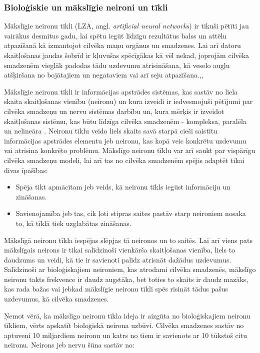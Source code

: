 \documentclass[12pt,paper=a4]{report}
\begin{document}
\subsubsection{Bioloģiskie un mākslīgie neironi un tīkli}
Mākslīgie neironu tīkli (LZA, angl. \textit{artificial neural networks}) ir tikuši pētīti jau vairākus desmitus gadu, lai spētu iegūt līdzīgu rezultātus balss un attēlu atpazīšanā kā izmantojot cilvēka maņu orgānus un smadzenes. Lai arī datoru skaitļošanas jaudas šobrīd ir kļuvušas spēcīgākas kā vēl nekad, joprojām cilvēka smadzenēm vieglāk padodas tādu uzdevumu atrisināšana, kā veselo augļu atšķiršana no bojātajiem un negataviem vai arī seju atpazīšana.\cite{NNIntroduction1987},\cite{NNforHyperspectralIm2010},\cite{zutersNeironuTikli}\par
Mākslīgie neironu tīkli ir informācijas apstrādes sistēmas, kas sastāv no liela skaita skaitļošanas vienību (neironu) un kura izveidi ir iedvesmojuši pētījumi par cilvēka smadzeņu un nervu sistēmas darbību un, kura mērķis ir izveidot skaitļošanas sistēmu, kas būtu līdzīga cilvēka smadzenēm - kompleksa, paralēla un nelineāra \cite{krose1993introduction}. Neironu tīklu veido liels skaits savā starpā cieši saistītu informācijas apstrādes elementu jeb neironu, kas kopā veic konkrētu uzdevumu vai atrisina konkrēto problēmu. Mākslīgo neironu tīklu var arī saukt par vispārīgu cilvēka smadzeņu modeli, lai arī tas no cilvēka smadzenēm spējis adaptēt tikai divas īpašības:
\begin{itemize}
\item Spēja tikt apmācītam jeb veids, kā neironu tīkls iegūst informāciju un zināšanas.
\item Savienojamība jeb tas, cik ļoti stipras saites pastāv starp neironiem nosaka to, kā tīklā tiek uzglabātas zināšanas.\cite{zutersNeironuTikli}\par
\end{itemize}
Mākslīgā neironu tīkla iespējas slēpjas tā neironos un to saitēs. Lai arī viens pats mākslīgais neirons ir tikai salīdzinoši vienkārša skaitļošanas vienība, liels to daudzums un veidi, kā tie ir savienoti palīdz atrisnāt dažādus uzdevumus. Salīdzinoši ar bioloģiskajiem neironiem, kas atrodami cilvēka smadzenēs, mākslīgo neironu takts frekvence ir daudz augstāka, bet toties to skaits ir daudz mazāks, kas rada bažas vai jebkad mākslīgie neironu tīkli spēs risināt tādus pašus uzdevumus, kā cilvēka smadzenes.\cite{zutersNeironuTikli}\par
Ņemot vērā, ka mākslīgo neironu tīkla ideja ir aizgūta no bioloģiskajiem neironu tīkliem, vērts apskatīt bioloģiskā neirona uzbūvi. Cilvēka smadzenes sastāv no aptuveni 10 miljardiem neironu un katrs no tiem ir savienots ar 10 tūkstoš citu neironu. Neirons jeb nervu šūna sastāv no:
\end{document}
